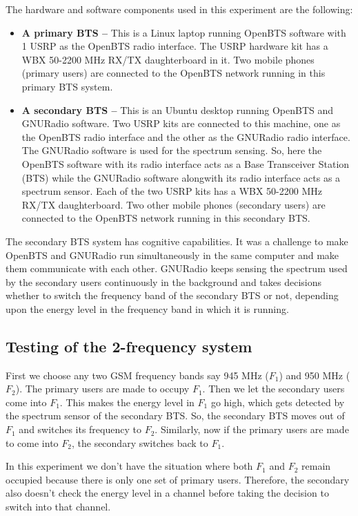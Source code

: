 The hardware and software components used in this experiment are the 
following:
\begin{itemize}
    \item \textbf{A primary BTS --} This is a Linux laptop running OpenBTS
    software with 1 USRP as the OpenBTS radio interface. The USRP hardware kit
    has a WBX 50-2200 MHz RX/TX daughterboard in it. Two mobile phones 
    (primary users) are connected to the OpenBTS network running in this 
    primary BTS system.
    \item \textbf{A secondary BTS --} This is an Ubuntu desktop running
    OpenBTS and GNURadio software. Two USRP kits are connected to this
    machine, one as the OpenBTS radio interface and the other as the GNURadio
    radio interface. The GNURadio software is used for the spectrum sensing. 
    So, here the OpenBTS software with its radio interface acts as a Base
    Transceiver Station (BTS) while the GNURadio software alongwith its radio
    interface acts as a spectrum sensor. Each of the two USRP kits has a
    WBX 50-2200 MHz RX/TX daughterboard. Two other mobile phones (secondary 
    users) are connected to the OpenBTS network running in this secondary BTS.
\end{itemize}

The secondary BTS system has cognitive capabilities. It was a challenge to 
make OpenBTS and GNURadio run simultaneously in the same computer and make 
them communicate with each other. GNURadio keeps sensing the spectrum used by
the secondary users continuously in the background and takes decisions whether
to switch the frequency band of the secondary BTS or not, depending upon the 
energy level in the frequency band in which it is running.

\subsection{Testing of the 2-frequency system}
First we choose any two GSM frequency bands say 945 MHz ($F_1$) and 950 MHz 
($F_2$). The primary users are made to occupy $F_1$. Then we let the secondary
users come into $F_1$. This makes the energy level in $F_1$ go high, which 
gets detected by the spectrum sensor of the secondary BTS. So, the secondary 
BTS moves out of $F_1$ and switches its frequency to $F_2$. Similarly, now if 
the primary users are made to come into $F_2$, the secondary switches back to 
$F_1$.

In this experiment we don't have the situation where both $F_1$ and $F_2$ 
remain occupied because there is only one set of primary users. Therefore, the 
secondary also doesn't check the energy level in a channel before taking the
decision to switch into that channel.

